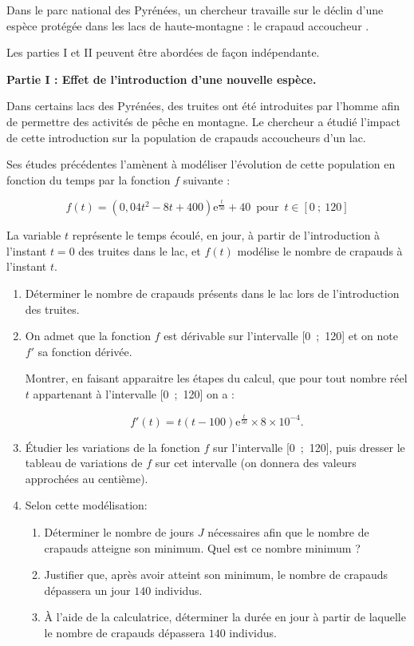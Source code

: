 
\medskip

Dans le parc national des Pyrénées, un chercheur travaille sur le déclin d'une espèce protégée dans les lacs de haute-montagne : le \og crapaud accoucheur \fg.

Les parties I et II peuvent être abordées de façon indépendante.

\begin{center}\textbf{Partie I : Effet de l'introduction d'une nouvelle espèce.}\end{center}

Dans certains lacs des Pyrénées, des truites ont été introduites par l'homme afin de permettre des activités de pêche en montagne. Le chercheur a étudié l'impact de cette introduction sur la
population de crapauds accoucheurs d'un lac.

Ses études précédentes l'amènent à modéliser l'évolution de cette population en fonction du temps par la fonction $f$ suivante : 

\[f(t) = \left(0,04t^2 - 8t + 400\right)\text{e}^{\frac{t}{50}} + 40 \, \text{ pour }\,  t \in [0~;~120]\]

La variable $t$ représente le temps écoulé, en jour, à partir de l'introduction à l'instant $t = 0$ des truites dans le lac, et $f(t)$ modélise le nombre de crapauds à l'instant $t$.

\medskip

\begin{enumerate}
\item Déterminer le nombre de crapauds présents dans le lac lors de l'introduction des truites.
\item On admet que la fonction $f$ est dérivable sur l'intervalle [0~;~120] et on note $f'$ sa fonction dérivée.

Montrer, en faisant apparaitre les étapes du calcul, que pour tout nombre réel $t$ appartenant à 
l'intervalle [0~;~120] on a : 

\[f'(t) = t(t - 100)\text{e}^{\frac{t}{50}} \times 8 \times 10^{-4}.\]

\item Étudier les variations de la fonction $f$ sur l'intervalle [0~;~120], puis dresser le tableau de variations de $f$ sur cet intervalle (on donnera des valeurs approchées au centième).
\item Selon cette modélisation:
	\begin{enumerate}
		\item Déterminer le nombre de jours $J$ nécessaires afin que le nombre de crapauds atteigne son minimum. Quel est ce nombre minimum ?
		\item Justifier que, après avoir atteint son minimum, le nombre de crapauds dépassera un jour $140$ individus.
		\item À l'aide de la calculatrice, déterminer la durée en jour à partir de laquelle le nombre de crapauds dépassera $140$ individus.
	\end{enumerate}
\end{enumerate}

